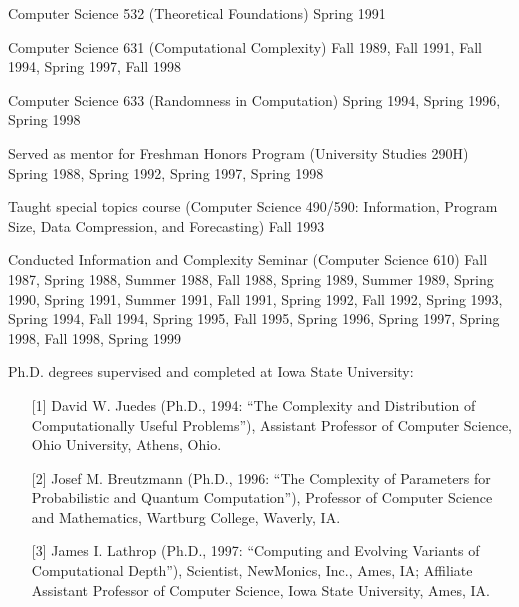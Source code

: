 \hangindent=0.9in
\hspace*{0.6in} Computer Science 532 (Theoretical Foundations) Spring 1991

\hangindent=0.9in
\hspace*{0.6in} Computer Science 631 (Computational Complexity)
Fall 1989, Fall 1991, Fall 1994, Spring 1997, Fall 1998

\hangindent=0.9in
\hspace*{0.6in} Computer Science 633 (Randomness in Computation)
Spring 1994, Spring 1996, Spring 1998

\vspace*{\medskipamount}
\hangindent=0.6in
Served as mentor for Freshman Honors Program (University Studies 290H)
Spring 1988, Spring 1992, Spring 1997, Spring 1998

\vspace*{\medskipamount}
\hangindent=0.6in
Taught special topics course (Computer Science 490/590: Information,
Program Size, Data Compression, and Forecasting) Fall 1993

\vspace*{\medskipamount}
\hangindent=0.6in
Conducted Information and Complexity Seminar (Computer
Science 610) Fall 1987, 
Spring 1988, Summer 1988, Fall 1988, Spring
1989, Summer 1989, Spring 1990, Spring 1991, 
Summer 1991, Fall 1991,
Spring 1992, Fall 1992, Spring 1993, Spring 1994,
Fall 1994, Spring 1995, Fall 1995, Spring 1996,
Spring 1997, Spring 1998, Fall 1998, Spring 1999

\vspace*{\medskipamount}
Ph.D. degrees supervised and completed at Iowa State University:

\begin{enumerate}
\item[{[1]}]
David W. Juedes (Ph.D., 1994: ``The Complexity and Distribution of
Computationally Useful Problems''), Assistant Professor of Computer
Science, Ohio University, Athens, Ohio.
\item[{[2]}]
Josef M. Breutzmann (Ph.D., 1996: ``The Complexity of Parameters for
Probabilistic and Quantum Computation''), Professor of
Computer Science and Mathematics, Wartburg College, Waverly, IA.
\item[{[3]}]
James I. Lathrop (Ph.D., 1997: ``Computing and Evolving
Variants of Computational Depth''), Scientist, NewMonics, Inc.,
Ames, IA; Affiliate Assistant Professor of Computer Science,
Iowa State University, Ames, IA.
\end{enumerate}

